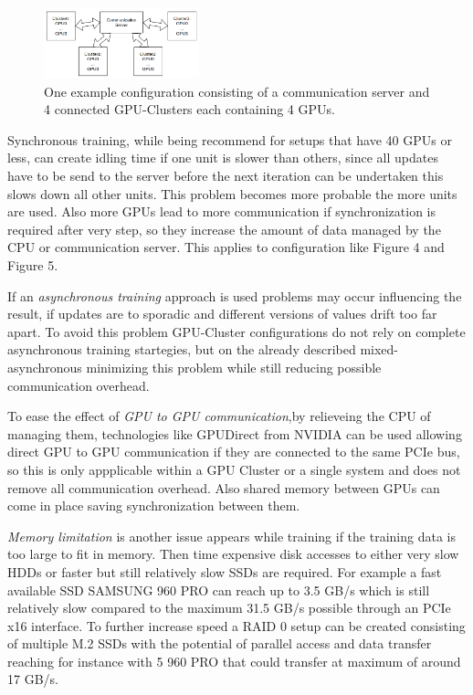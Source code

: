 \documentclass[conference]{IEEEtran}
\begin{document}
\begin{figure}
\centering
\includegraphics[width=0.4\textwidth]{cluster_setup.png}
\caption{One example configuration consisting of a communication server and 4 connected GPU-Clusters each containing 4 GPUs.}
\end{figure}
Synchronous training, while being recommend for setups that have 40 GPUs or less, can create idling time if one unit is slower than others, since all updates have to be send to the server before the next iteration can be undertaken this slows down all other units. This problem becomes more probable the more units are used. Also more GPUs lead to more communication if synchronization is required after very step, so they increase the amount of data managed by the CPU or communication server. This applies to configuration like Figure 4 and Figure 5.

If an \emph{asynchronous training} approach is used problems may occur influencing the result, if updates are to sporadic and different versions of values drift too far apart. To avoid this problem GPU-Cluster configurations do not rely on complete asynchronous training startegies, but on the already described mixed-asynchronous minimizing this problem while still reducing possible communication overhead.

To ease the effect of \emph{GPU to GPU communication},by relieveing the CPU of managing them, technologies like GPUDirect from NVIDIA\cite{nvidiagpudirect2017} can be used allowing direct GPU to GPU communication if they are connected to the same PCIe bus, so this is only appplicable within a GPU Cluster or a single system and does not remove all communication overhead. Also shared memory between GPUs can come in place saving synchronization between them.

\emph{Memory limitation} is another issue appears while training if the training data is too large to fit in memory. Then time expensive disk accesses to either very slow HDDs or faster but still relatively slow SSDs are required. For example a fast available SSD SAMSUNG 960 PRO can reach up to 3.5 GB/s which is still relatively slow compared to the maximum 31.5 GB/s possible through an PCIe x16 interface. To further increase speed a RAID 0 setup can be created consisting of multiple M.2 SSDs with the potential of parallel access and data transfer reaching for instance with 5 960 PRO that could transfer at maximum of around 17 GB/s.
\end{document}
